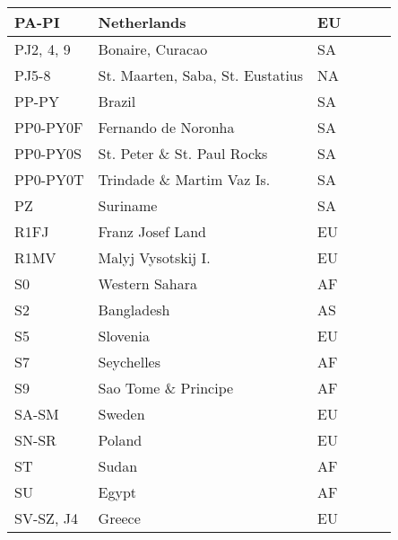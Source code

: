 \documentclass[a4paper]{article}
\begin{document}
\begin{longtable}{|p{1.5cm}|p{4cm}|l|p{2cm}|p{2cm}|p{2cm}|}
\hline
PA-PI                  & Netherlands                                & EU    & & & \\
\hline
PJ2, 4, 9              & Bonaire, Curacao                           & SA    & & & \\
\hline
PJ5-8                  & St. Maarten, Saba, St. Eustatius           & NA    & & & \\
\hline
PP-PY                  & Brazil                                     & SA    & & & \\
\hline
PP0-PY0F               & Fernando de Noronha                        & SA    & & & \\
\hline
PP0-PY0S               & St. Peter \& St. Paul Rocks                & SA    & & & \\
\hline
PP0-PY0T               & Trindade \& Martim Vaz Is.                 & SA    & & & \\
\hline
PZ                     & Suriname                                   & SA    & & & \\
\hline
R1FJ                   & Franz Josef Land                           & EU    & & & \\
\hline
R1MV                   & Malyj Vysotskij I.                         & EU    & & & \\
\hline
S0                     & Western Sahara                             & AF    & & & \\
\hline
S2                     & Bangladesh                                 & AS    & & & \\
\hline
S5                     & Slovenia                                   & EU    & & & \\
\hline
S7                     & Seychelles                                 & AF    & & & \\
\hline
S9                     & Sao Tome \& Principe                       & AF    & & & \\
\hline
SA-SM                  & Sweden                                     & EU    & & & \\
\hline
SN-SR                  & Poland                                     & EU    & & & \\
\hline
ST                     & Sudan                                      & AF    & & & \\
\hline
SU                     & Egypt                                      & AF    & & & \\
\hline
SV-SZ, J4              & Greece                                     & EU    & & & \\

\end{longtable}
\end{document}
